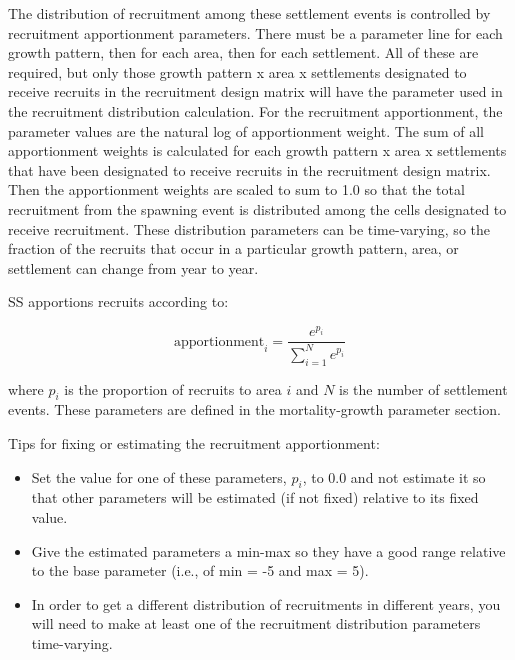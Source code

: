 The distribution of recruitment among these settlement events is controlled by recruitment apportionment parameters. There must be a parameter line for each growth pattern, then for each area, then for each settlement. All of these are required, but only those growth pattern x area x settlements designated to receive recruits in the recruitment design matrix will have the parameter used in the recruitment distribution calculation. For the recruitment apportionment, the parameter values are the natural log of apportionment weight. The sum of all apportionment weights is calculated for each growth pattern x area x settlements that have been designated to receive recruits in the recruitment design matrix. Then the apportionment weights are scaled to sum to 1.0 so that the total recruitment from the spawning event is distributed among the cells designated to receive recruitment. These distribution parameters can be time-varying, so the fraction of the recruits that occur in a particular growth pattern, area, or settlement can change from year to year. 

\hypertarget{recdist}{}
SS apportions recruits according to:

\begin{equation}
	\text{apportionment}_i = \frac{e^{p_i}}{\sum_{i=1}^{N}e^{p_i}}
\end{equation}

where $p_i$ is the proportion of recruits to area $i$ and $N$ is the number of settlement events.  These parameters are defined in the mortality-growth parameter section.  

Tips for fixing or estimating the recruitment apportionment:
\begin{itemize}
	
	\item Set the value for one of these parameters, $p_i$, to 0.0 and not estimate it so that other parameters will be estimated (if not fixed) relative to its fixed value.
	
	\item Give the estimated parameters a min-max so they have a good range relative to the base parameter (i.e., of min = -5 and max = 5).
	
	\item In order to get a different distribution of recruitments in different years, you will need to make at least one of the recruitment distribution parameters time-varying.

\end{itemize}	

